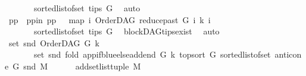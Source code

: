 \begin{isabellebody}
\ \ \ \ \ \ \ {\isacharparenleft}{\kern0pt}sorted{\isacharunderscore}{\kern0pt}list{\isacharunderscore}{\kern0pt}of{\isacharunderscore}{\kern0pt}set\ {\isacharparenleft}{\kern0pt}tips\ G{\isacharparenright}{\kern0pt}{\isacharparenright}{\kern0pt}{\isacharparenright}{\kern0pt}{\isachardoublequoteclose}\ \isamarkupfalse%
\ auto\isanewline
\ \ \ \ \ \ \isamarkupfalse%
\ pp\ \ pp{\isacharunderscore}{\kern0pt}in{\isacharcolon}{\kern0pt}\ {\isachardoublequoteopen}pp\ {\isacharequal}{\kern0pt}\ \ {\isacharparenleft}{\kern0pt}map\ {\isacharparenleft}{\kern0pt}{\isasymlambda}i{\isachardot}{\kern0pt}\ {\isacharparenleft}{\kern0pt}OrderDAG\ {\isacharparenleft}{\kern0pt}reduce{\isacharunderscore}{\kern0pt}past\ G\ i{\isacharparenright}{\kern0pt}\ k{\isacharcomma}{\kern0pt}\ i{\isacharparenright}{\kern0pt}{\isacharparenright}{\kern0pt}\isanewline
\ \ \ \ \ \ \ {\isacharparenleft}{\kern0pt}sorted{\isacharunderscore}{\kern0pt}list{\isacharunderscore}{\kern0pt}of{\isacharunderscore}{\kern0pt}set\ {\isacharparenleft}{\kern0pt}tips\ G{\isacharparenright}{\kern0pt}{\isacharparenright}{\kern0pt}{\isacharparenright}{\kern0pt}{\isachardoublequoteclose}\ \isamarkupfalse%
\ blockDAG{\isachardot}{\kern0pt}tips{\isacharunderscore}{\kern0pt}exist\ \isamarkupfalse%
\ auto\isanewline
\ \ \ \ \ \ \isamarkupfalse%
\ {\isachardoublequoteopen}set\ {\isacharparenleft}{\kern0pt}snd\ {\isacharparenleft}{\kern0pt}OrderDAG\ G\ k{\isacharparenright}{\kern0pt}{\isacharparenright}{\kern0pt}\ {\isacharequal}{\kern0pt}\isanewline
\ \ \ \ \ \ \ set\ {\isacharparenleft}{\kern0pt}snd\ {\isacharparenleft}{\kern0pt}fold\ {\isacharparenleft}{\kern0pt}app{\isacharunderscore}{\kern0pt}if{\isacharunderscore}{\kern0pt}blue{\isacharunderscore}{\kern0pt}else{\isacharunderscore}{\kern0pt}add{\isacharunderscore}{\kern0pt}end\ G\ k{\isacharparenright}{\kern0pt}\ {\isacharparenleft}{\kern0pt}top{\isacharunderscore}{\kern0pt}sort\ G\ {\isacharparenleft}{\kern0pt}sorted{\isacharunderscore}{\kern0pt}list{\isacharunderscore}{\kern0pt}of{\isacharunderscore}{\kern0pt}set\ {\isacharparenleft}{\kern0pt}anticone\ G\ {\isacharparenleft}{\kern0pt}snd\ M{\isacharparenright}{\kern0pt}{\isacharparenright}{\kern0pt}{\isacharparenright}{\kern0pt}{\isacharparenright}{\kern0pt}\isanewline
\ \ \ \ \ \ {\isacharparenleft}{\kern0pt}add{\isacharunderscore}{\kern0pt}set{\isacharunderscore}{\kern0pt}list{\isacharunderscore}{\kern0pt}tuple\ M{\isacharparenright}{\kern0pt}{\isacharparenright}{\kern0pt}{\isacharparenright}{\kern0pt}{\isachardoublequoteclose}\ \isamarkupfalse%

\end{isabellebody}
